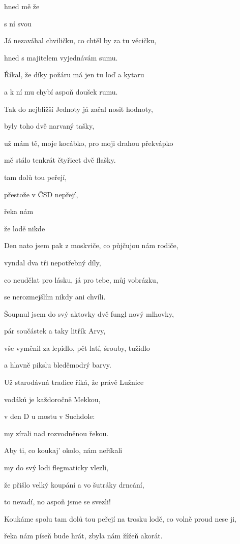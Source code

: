 

\zs
{}     

    

hned  mě  že  

s ní  svou   
\ks

\zs
Já nezaváhal chviličku, co chtěl by za tu věcičku,

hned s majitelem vyjednávám sumu.

Říkal, že díky požáru má jen tu loď a kytaru

a k ní mu chybí aspoň doušek rumu.
\ks

\zs
Tak do nejbližší Jednoty já začal nosit hodnoty,

byly toho dvě narvaný tašky,

už mám tě, moje kocábko, pro moji drahou překvápko

mě stálo tenkrát čtyřicet dvě flašky.
\ks

\zr
{}  tam dolů tou peřejí,

přestože  v ČSD nepřejí,

řeka nám   

že lodě  nikde 
\kr

\zs
Den nato jsem pak z moskviče, co půjčujou nám rodiče,

vyndal dva tři nepotřebný díly,

co neudělat pro lásku, já pro tebe, můj vobrázku,

se nerozmejšlím nikdy ani chvíli.
\ks

\zs
Šoupnul jsem do svý aktovky dvě fungl nový mlhovky,

pár součástek a taky litřík Arvy,

vše vyměnil za lepidlo, pět latí, šrouby, tužidlo

a hlavně pikslu bleděmodrý barvy.
\ks

\zs
Už starodávná tradice říká, že právě Lužnice

vodáků je každoročně Mekkou,

v den D u mostu v Suchdole: 

my zírali nad rozvodněnou řekou.
\ks

\zs
Aby ti, co koukaj' okolo, nám neříkali 

my do svý lodi flegmaticky vlezli,

že přišlo velký koupání a vo šutráky drncání,

to nevadí, no aspoň jsme se svezli!
\ks

\zr
Koukáme spolu tam dolů tou peřejí na trosku lodě, co volně proud nese ji,

řeka nám píseň bude hrát, zbyla nám žížeň akorát.
\kr

\kp
